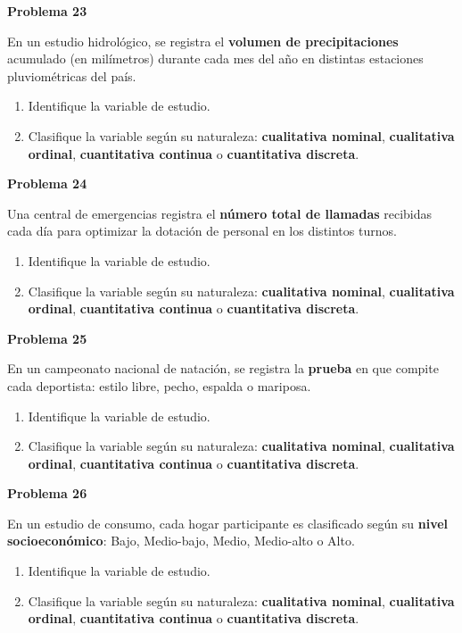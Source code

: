 \documentclass[10pt,letterpaper]{article}
\newcommand{\problema}[1]{%
  \vspace{2pt}%
  \begin{tcolorbox}[
    enhanced,
    colback=white,
    colframe=black,
    arc=0pt,
    boxrule=0pt,
    leftrule=2pt,
    left=6pt, right=6pt,
    top=1pt, bottom=1pt,
  ]
    {\normalsize\bfseries\sffamily #1}
  \end{tcolorbox}%
  \vspace{1pt}%
}
\begin{document}
\problema{Problema 23}
\noindent\sffamily\small En un estudio hidrol\'ogico, se registra el \textbf{volumen de precipitaciones} acumulado (en mil\'imetros) durante cada mes del a\~no en distintas estaciones pluviom\'etricas del pa\'is.
\begin{enumerate}[leftmargin=1.2cm, label=\textbf{\alph*)}, itemsep=0pt, topsep=2pt]
  \item Identifique la variable de estudio.
  \item Clasifique la variable seg\'un su naturaleza: \textbf{cualitativa nominal}, \textbf{cualitativa ordinal}, \textbf{cuantitativa continua} o \textbf{cuantitativa discreta}.
\end{enumerate}

\problema{Problema 24}
\noindent\sffamily\small Una central de emergencias registra el \textbf{n\'umero total de llamadas} recibidas cada d\'ia para optimizar la dotaci\'on de personal en los distintos turnos.
\begin{enumerate}[leftmargin=1.2cm, label=\textbf{\alph*)}, itemsep=0pt, topsep=2pt]
  \item Identifique la variable de estudio.
  \item Clasifique la variable seg\'un su naturaleza: \textbf{cualitativa nominal}, \textbf{cualitativa ordinal}, \textbf{cuantitativa continua} o \textbf{cuantitativa discreta}.
\end{enumerate}

\problema{Problema 25}
\noindent\sffamily\small En un campeonato nacional de nataci\'on, se registra la \textbf{prueba} en que compite cada deportista: estilo libre, pecho, espalda o mariposa.
\begin{enumerate}[leftmargin=1.2cm, label=\textbf{\alph*)}, itemsep=0pt, topsep=2pt]
  \item Identifique la variable de estudio.
  \item Clasifique la variable seg\'un su naturaleza: \textbf{cualitativa nominal}, \textbf{cualitativa ordinal}, \textbf{cuantitativa continua} o \textbf{cuantitativa discreta}.
\end{enumerate}

\problema{Problema 26}
\noindent\sffamily\small En un estudio de consumo, cada hogar participante es clasificado seg\'un su \textbf{nivel socioecon\'omico}: Bajo, Medio-bajo, Medio, Medio-alto o Alto.
\begin{enumerate}[leftmargin=1.2cm, label=\textbf{\alph*)}, itemsep=0pt, topsep=2pt]
  \item Identifique la variable de estudio.
  \item Clasifique la variable seg\'un su naturaleza: \textbf{cualitativa nominal}, \textbf{cualitativa ordinal}, \textbf{cuantitativa continua} o \textbf{cuantitativa discreta}.
\end{enumerate}
\end{document}
